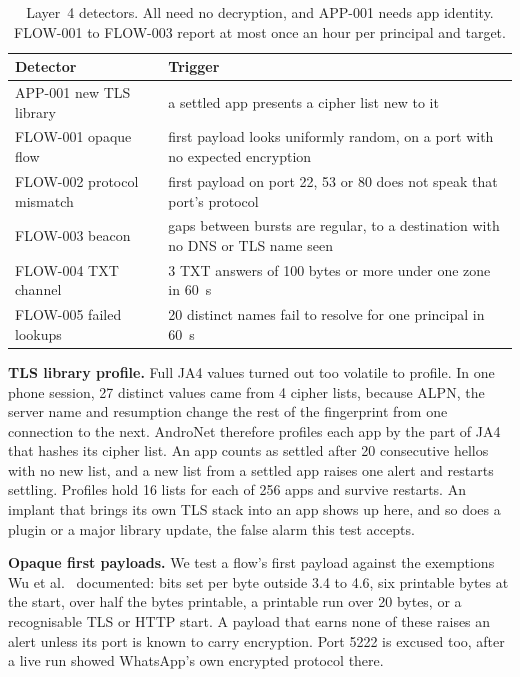 \documentclass[runningheads]{llncs}
\begin{document}
\begin{table}[t]
\centering
\caption{Layer~4 detectors. All need no decryption, and APP-001 needs app identity. FLOW-001 to FLOW-003 report at most once an hour per principal and target.}\label{tab:l4}
\small
\begin{tabular}{@{}lp{}@{}}
\toprule
Detector & Trigger \\
\midrule
APP-001 new TLS library & a settled app presents a cipher list new to it \\
FLOW-001 opaque flow & first payload looks uniformly random, on a port with no expected encryption \\
FLOW-002 protocol mismatch & first payload on port 22, 53 or 80 does not speak that port's protocol \\
FLOW-003 beacon & gaps between bursts are regular, to a destination with no DNS or TLS name seen \\
FLOW-004 TXT channel & 3 TXT answers of 100 bytes or more under one zone in 60~s \\
FLOW-005 failed lookups & 20 distinct names fail to resolve for one principal in 60~s \\
\bottomrule
\end{tabular}
\end{table}

\textbf{TLS library profile.} Full JA4 values turned out too volatile to profile. In one phone session, 27 distinct values came from 4 cipher lists, because ALPN, the server name and resumption change the rest of the fingerprint from one connection to the next. AndroNet therefore profiles each app by the part of JA4 that hashes its cipher list. An app counts as settled after 20 consecutive hellos with no new list, and a new list from a settled app raises one alert and restarts settling. Profiles hold 16 lists for each of 256 apps and survive restarts. An implant that brings its own TLS stack into an app shows up here, and so does a plugin or a major library update, the false alarm this test accepts.

\textbf{Opaque first payloads.} We test a flow's first payload against the exemptions Wu et al.~\cite{wu2023} documented: bits set per byte outside 3.4 to 4.6, six printable bytes at the start, over half the bytes printable, a printable run over 20 bytes, or a recognisable TLS or HTTP start. A payload that earns none of these raises an alert unless its port is known to carry encryption. Port 5222 is excused too, after a live run showed WhatsApp's own encrypted protocol there.
\end{document}
